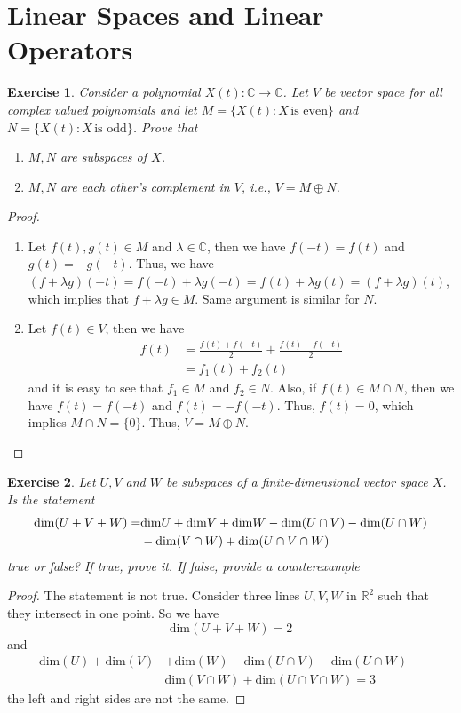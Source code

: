 \documentclass[11pt]{book}
\newtheorem{exercise}{Exercise}[section]
\theoremstyle{definition}
\numberwithin{equation}{subsection}
\begin{document}
\section{Linear Spaces and Linear Operators}
\begin{exercise}\label{ex_1}
Consider a polynomial $X(t):\mathbb{C}\to\mathbb{C}$. Let $V$ be vector space for all complex valued polynomials and let $M = \{X(t): X \,\text{is even}\}$ and $N = \{X(t): X \,\text{is odd}\}$. Prove that 
\begin{enumerate}[label=(\alph*)]
    \item $M,N$ are subspaces of $X$.
    \item $M, N$ are each other's complement in $V$, i.e., $V = M\oplus N$.
\end{enumerate}
\end{exercise}
\begin{proof}
~\begin{enumerate}[label=(\alph*)]
    \item Let $f(t), g(t)\in M$ and $\lambda\in\mathbb{C}$, then we have $f(-t) = f(t)$ and $g(t) = -g(-t)$. Thus, we have $(f+\lambda g)(-t) = f(-t) + \lambda g(-t) = f(t) + \lambda g(t) = (f+\lambda g)(t)$, which implies that $f+\lambda g\in M$. Same argument is similar for $N$.
    \item Let $f(t)\in V$, then we have 
    \begin{align*}
        f(t) & = \frac{f(t) + f(-t)}{2} + \frac{f(t) - f(-t)}{2} \\
        & = f_1(t) + f_2(t)
    \end{align*}
    and it is easy to see that $f_1\in M$ and $f_2\in N$. Also, if $f(t)\in M\cap N$, then we have $f(t) = f(-t)$ and $f(t) = -f(-t)$. Thus, $f(t) = 0$, which implies $M\cap N = \{0\}$. Thus, $V = M\oplus N$.
\end{enumerate}
\end{proof}

\medskip

\begin{exercise}\label{ex_2}
Let $U, V$ and $W$ be subspaces of a finite-dimensional vector space $X$. Is the statement
\begin{align*}
    {\rm dim}(U + V + W) = & {\rm dim} U + {\rm dim} V + {\rm dim} W - {\rm dim}(U \cap V) - {\rm dim}(U \cap W) \\
    & - {\rm dim}(V \cap W) + {\rm dim}(U \cap V \cap W)
\end{align*}
true or false? If true, prove it. If false, provide a counterexample
\end{exercise}
\begin{proof}
The statement is not true. Consider three lines $U,V,W$ in $\mathbb{R}^2$ such that they intersect in one point. So we have
$$\text{dim} (U+V+W) = 2$$
and
\begin{align*}
   \text{dim}(U) + \text{dim}(V) & + \text{dim}(W) - \text{dim}(U \cap V) - \text{dim}(U \cap W) - \\
   & \text{dim}(V \cap W) + \text{dim}(U \cap V \cap W) = 3
\end{align*}
the left and right sides are not the same. 
\end{proof}
\end{document}
